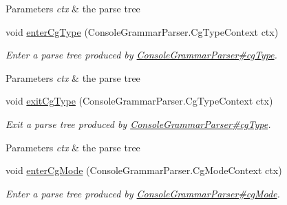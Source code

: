 \begin{DoxyCompactItemize}
\begin{DoxyCompactList}
\begin{DoxyParams}{Parameters}
{\em ctx} & the parse tree\\
\hline
\end{DoxyParams}
 \end{DoxyCompactList}\item 
void \hyperlink{classgov_1_1nasa_1_1jpf_1_1inspector_1_1client_1_1parser_1_1_console_grammar_base_listener_a7f2ea69c9d119b9749d7d472d7d9c9ec}{enter\+Cg\+Type} (Console\+Grammar\+Parser.\+Cg\+Type\+Context ctx)
\begin{DoxyCompactList}\small\item\em Enter a parse tree produced by \hyperlink{classgov_1_1nasa_1_1jpf_1_1inspector_1_1client_1_1parser_1_1_console_grammar_parser_ae6e3125de4230c77d8a95cd8064e96d7}{Console\+Grammar\+Parser\#cg\+Type}.


\begin{DoxyParams}{Parameters}
{\em ctx} & the parse tree\\
\hline
\end{DoxyParams}
 \end{DoxyCompactList}\item 
void \hyperlink{classgov_1_1nasa_1_1jpf_1_1inspector_1_1client_1_1parser_1_1_console_grammar_base_listener_a2ccc1ed0163069cfc45d9024a030a357}{exit\+Cg\+Type} (Console\+Grammar\+Parser.\+Cg\+Type\+Context ctx)
\begin{DoxyCompactList}\small\item\em Exit a parse tree produced by \hyperlink{classgov_1_1nasa_1_1jpf_1_1inspector_1_1client_1_1parser_1_1_console_grammar_parser_ae6e3125de4230c77d8a95cd8064e96d7}{Console\+Grammar\+Parser\#cg\+Type}.


\begin{DoxyParams}{Parameters}
{\em ctx} & the parse tree\\
\hline
\end{DoxyParams}
 \end{DoxyCompactList}\item 
void \hyperlink{classgov_1_1nasa_1_1jpf_1_1inspector_1_1client_1_1parser_1_1_console_grammar_base_listener_ad85194a5ea94a6e7d5e20a2867d38f97}{enter\+Cg\+Mode} (Console\+Grammar\+Parser.\+Cg\+Mode\+Context ctx)
\begin{DoxyCompactList}\small\item\em Enter a parse tree produced by \hyperlink{classgov_1_1nasa_1_1jpf_1_1inspector_1_1client_1_1parser_1_1_console_grammar_parser_af43a448b70b2817dcedfc1f3d360cd42}{Console\+Grammar\+Parser\#cg\+Mode}.



\end{DoxyCompactList}
\end{DoxyCompactItemize}
